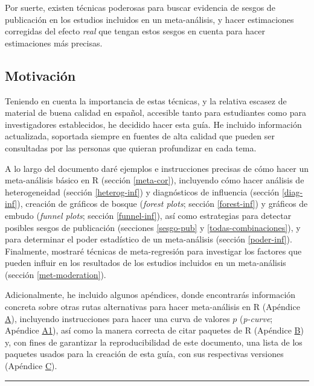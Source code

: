 \documentclass[
  bookmarksnumbered]{article}
\begin{document}
Por suerte, existen técnicas poderosas para buscar evidencia de sesgos de publicación en los estudios incluidos en un meta-análisis, y hacer estimaciones corregidas del efecto \emph{real} que tengan estos sesgos en cuenta para hacer estimaciones más precisas.

\hypertarget{motivaciuxf3n}{%
\subsection{Motivación}\label{motivaciuxf3n}}

Teniendo en cuenta la importancia de estas técnicas, y la relativa escasez de material de buena calidad en español, accesible tanto para estudiantes como para investigadores establecidos, he decidido hacer esta guía. He incluido información actualizada, soportada siempre en fuentes de alta calidad que pueden ser consultadas por las personas que quieran profundizar en cada tema.

A lo largo del documento daré ejemplos e instrucciones precisas de cómo hacer un meta-análisis básico en R (sección \ref{meta-cor}), incluyendo cómo hacer análisis de heterogeneidad (sección \ref{heterog-inf}) y diagnósticos de influencia (sección \ref{diag-inf}), creación de gráficos de bosque (\emph{forest plots}; sección \ref{forest-inf}) y gráficos de embudo (\emph{funnel plots}; sección \ref{funnel-inf}), así como estrategias para detectar posibles sesgos de publicación (secciones \ref{sesgo-pub} y \ref{todas-combinaciones}), y para determinar el poder estadístico de un meta-análisis (sección \ref{poder-inf}). Finalmente, mostraré técnicas de meta-regresión para investigar los factores que pueden influir en los resultados de los estudios incluidos en un meta-análisis (sección \ref{met-moderation}).

Adicionalmente, he incluido algunos apéndices, donde encontrarás información concreta sobre otras rutas alternativas para hacer meta-análisis en R (Apéndice \hyperlink{apendice-alt}{A}), incluyendo instrucciones para hacer una curva de valores \(p\) (\emph{p-curve}; Apéndice \hyperlink{p-curve}{A1}), así como la manera correcta de citar paquetes de R (Apéndice \hyperlink{paquetes-cit}{B}) y, con fines de garantizar la reproducibilidad de este documento, una lista de los paquetes usados para la creación de esta guía, con sus respectivas versiones (Apéndice \hyperlink{paquetes-list}{C}).

\begin{center}\rule{0.5\linewidth}{0.5pt}\end{center}
\end{document}
